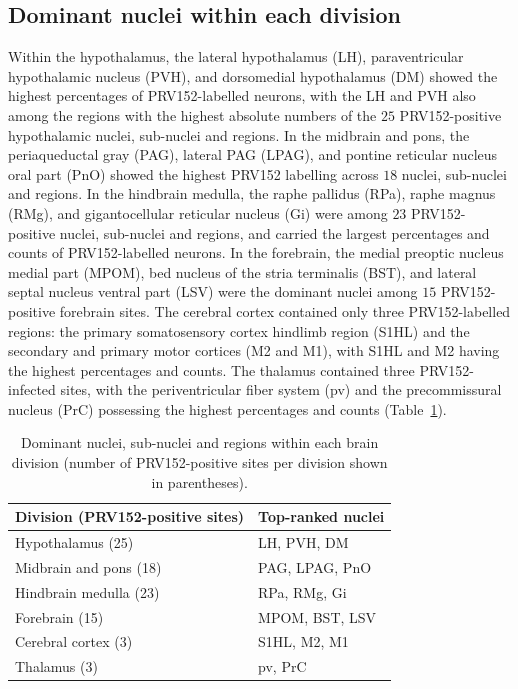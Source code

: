 \documentclass[11pt]{article}
\begin{document}
\subsection{Dominant nuclei within each division}
Within the hypothalamus, the lateral hypothalamus (LH), paraventricular hypothalamic nucleus (PVH), and dorsomedial hypothalamus (DM) showed the highest percentages of PRV152-labelled neurons, with the LH and PVH also among the regions with the highest absolute numbers of the $25$ PRV152-positive hypothalamic nuclei, sub-nuclei and regions. In the midbrain and pons, the periaqueductal gray (PAG), lateral PAG (LPAG), and pontine reticular nucleus oral part (PnO) showed the highest PRV152 labelling across $18$ nuclei, sub-nuclei and regions. In the hindbrain medulla, the raphe pallidus (RPa), raphe magnus (RMg), and gigantocellular reticular nucleus (Gi) were among $23$ PRV152-positive nuclei, sub-nuclei and regions, and carried the largest percentages and counts of PRV152-labelled neurons. In the forebrain, the medial preoptic nucleus medial part (MPOM), bed nucleus of the stria terminalis (BST), and lateral septal nucleus ventral part (LSV) were the dominant nuclei among $15$ PRV152-positive forebrain sites. The cerebral cortex contained only three PRV152-labelled regions: the primary somatosensory cortex hindlimb region (S1HL) and the secondary and primary motor cortices (M2 and M1), with S1HL and M2 having the highest percentages and counts. The thalamus contained three PRV152-infected sites, with the periventricular fiber system (pv) and the precommissural nucleus (PrC) possessing the highest percentages and counts (Table~\ref{tab:topsites}).

\begin{table}[h]
\centering
\caption{Dominant nuclei, sub-nuclei and regions within each brain division (number of PRV152-positive sites per division shown in parentheses).}
\label{tab:topsites}
\begin{tabular}{ll}
\toprule
Division (PRV152-positive sites) & Top-ranked nuclei \\
\midrule
Hypothalamus (25) & LH, PVH, DM \\
Midbrain and pons (18) & PAG, LPAG, PnO \\
Hindbrain medulla (23) & RPa, RMg, Gi \\
Forebrain (15) & MPOM, BST, LSV \\
Cerebral cortex (3) & S1HL, M2, M1 \\
Thalamus (3) & pv, PrC \\
\bottomrule
\end{tabular}
\end{table}
\end{document}
